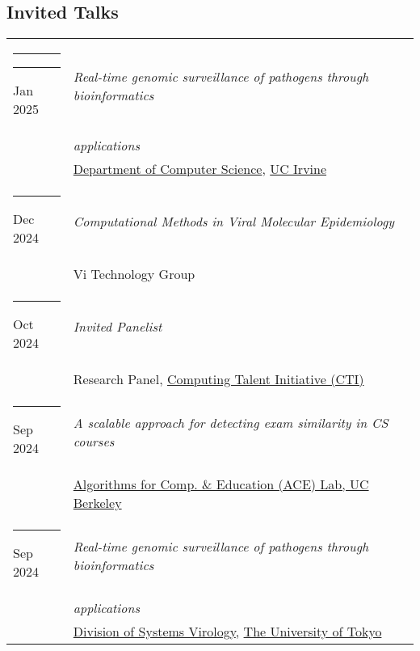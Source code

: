 \documentclass[margin,line]{res}
\begin{document}
\begin{resume}
\section{\sc Invited Talks}
\begin{longtable}{@{}p{0.7in}p{4in}}\rule{-1mm}{4.5mm}
\hspace*{-4mm} \rule{-1mm}{5mm} Jan 2025 & \textit{Real-time genomic surveillance of pathogens through bioinformatics}\\*
\hspace*{-4mm} & \hspace{4mm} \textit{applications}\\*
\hspace*{-4mm} & \hspace{4mm} \href{https://ics.uci.edu/}{Department of Computer Science}, \href{https://uci.edu/}{UC Irvine}\\
\hspace*{-4mm} \rule{-1mm}{5mm} Dec 2024 & \textit{Computational Methods in Viral Molecular Epidemiology}\\*
\hspace*{-4mm} & \hspace{4mm} Vi Technology Group\\
\hspace*{-4mm} \rule{-1mm}{5mm} Oct 2024 & \textit{Invited Panelist}\\*
\hspace*{-4mm} & \hspace{4mm} Research Panel, \href{https://computingtalentinitiative.org/}{Computing Talent Initiative (CTI)}\\
\hspace*{-4mm} \rule{-1mm}{5mm} Sep 2024 & \textit{A scalable approach for detecting exam similarity in CS courses}\\*
\hspace*{-4mm} & \hspace{4mm} \href{https://acelab.berkeley.edu/}{Algorithms for Comp. \& Education (ACE) Lab, UC Berkeley}\\
\hspace*{-4mm} \rule{-1mm}{5mm} Sep 2024 & \textit{Real-time genomic surveillance of pathogens through bioinformatics}\\*
\hspace*{-4mm} & \hspace{4mm} \textit{applications}\\*
\hspace*{-4mm} & \hspace{4mm} \href{https://www.ims.u-tokyo.ac.jp/imsut/en/lab/ggclink/section04.html}{Division of Systems Virology}, \href{https://www.u-tokyo.ac.jp/en/}{The University of Tokyo}\\

\end{longtable}
\end{resume}
\end{document}
